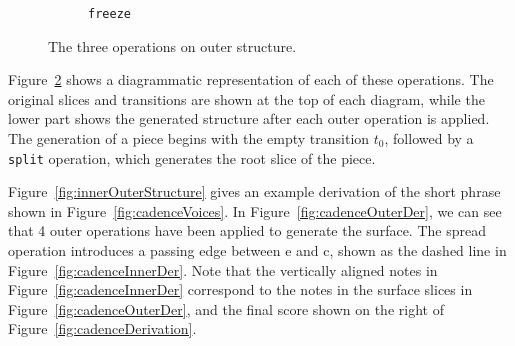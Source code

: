 \documentclass[12pt,a4paper,twoside,openright]{report}
\theoremstyle{definition}
\begin{document}
\begin{figure}[h]
\begin{subfigure}[t]{.24\textwidth}
    \caption{\texttt{freeze}}
    \label{fig:freezeOp}
  \end{subfigure}
  \centering
  \captionsetup{width=.9\linewidth}
  \caption{The three operations on outer structure. }
  \label{fig:outerOperations}
\end{figure}

Figure~\ref{fig:outerOperations} shows a diagrammatic representation of each of these operations. The original slices and transitions are shown at the top of each diagram, while the lower part shows the generated structure after each outer operation is applied. The generation of a piece begins with the empty transition $t_0$, followed by a \texttt{split} operation, which generates the root slice of the piece. 

Figure~\ref{fig:innerOuterStructure} gives an example derivation of the short phrase shown in Figure~\ref{fig:cadenceVoices}. In Figure~\ref{fig:cadenceOuterDer}, we can see that 4 outer operations have been applied to generate the surface. The spread operation introduces a passing edge between e and c, shown as the dashed line in Figure~\ref{fig:cadenceInnerDer}. Note that the vertically aligned notes in Figure~\ref{fig:cadenceInnerDer} correspond to the notes in the surface slices in Figure~\ref{fig:cadenceOuterDer}, and the final score shown on the right of Figure~\ref{fig:cadenceDerivation}.
\end{document}
